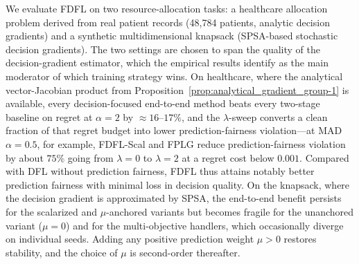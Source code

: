 

We evaluate FDFL on two resource-allocation tasks: a healthcare
allocation problem derived from real patient records (48{,}784
patients, analytic decision gradients) and a synthetic multidimensional
knapsack (SPSA-based stochastic decision gradients). The two settings
are chosen to span the quality of the decision-gradient estimator,
which the empirical results identify as the main moderator of which
training strategy wins. On healthcare, where the analytical
vector-Jacobian product from Proposition~\ref{prop:analytical_gradient_group-1}
is available, every decision-focused end-to-end method beats every
two-stage baseline on regret at $\alpha = 2$ by $\approx 16$--$17\%$,
and the $\lambda$-sweep converts a clean fraction of that regret
budget into lower prediction-fairness violation---at MAD $\alpha = 0.5$,
for example, FDFL-Scal and FPLG reduce prediction-fairness violation
by about $75\%$ going from $\lambda = 0$ to $\lambda = 2$ at a regret
cost below $0.001$. Compared with DFL without prediction fairness,
FDFL thus attains notably better prediction fairness with minimal
loss in decision quality. On the knapsack, where the decision gradient
is approximated by SPSA, the end-to-end benefit persists for the
scalarized and $\mu$-anchored variants but becomes fragile for the
unanchored variant ($\mu = 0$) and for the multi-objective handlers,
which occasionally diverge on individual seeds. Adding any positive
prediction weight $\mu > 0$ restores stability, and the choice of
$\mu$ is second-order thereafter.


